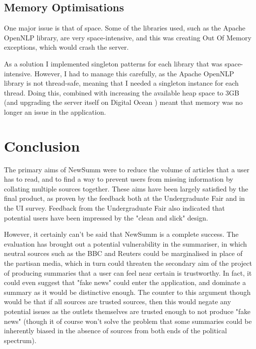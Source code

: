 \documentclass[12pt]{article}
\begin{document}
\label{apioptimisation}

\subsection{Memory Optimisations}

One major issue is that of space. Some of the libraries used, such as the Apache OpenNLP \cite{opennlp} library, are very space-intensive, and this was creating Out Of Memory exceptions, which would crash the server. 

As a solution I implemented singleton patterns for each library that was space-intensive. However, I had to manage this carefully, as the Apache OpenNLP library is not thread-safe, meaning that I needed a singleton instance for each thread. Doing this, combined with increasing the available heap space to 3GB (and upgrading the server itself on Digital Ocean \cite{digitalOcean}) meant that memory was no longer an issue in the application.


\newpage

\section{Conclusion}

The primary aims of NewSumm were to reduce the volume of articles that a user has to read, and to find a way to prevent users from missing information by collating multiple sources together. These aims have been largely satisfied by the final product, as proven by the feedback both at the Undergraduate Fair and in the UI survey. Feedback from the Undergraduate Fair also indicated that potential users have been impressed by the "clean and slick" design.

However, it certainly can't be said that NewSumm is a complete success. The evaluation has brought out a potential vulnerability in the summariser, in which neutral sources such as the BBC \cite{bbc} and Reuters \cite{reuters} could be marginalised in place of the partisan media, which in turn could threaten the secondary aim of the project of producing summaries that a user can feel near certain is trustworthy. In fact, it could even suggest that "fake news" could enter the application, and dominate a summary as it would be distinctive enough. The counter to this argument though would be that if all sources are trusted sources, then this would negate any potential issues as the outlets themselves are trusted enough to not produce "fake news" (though it of course won't solve the problem that some summaries could be inherently biased in the absence of sources from both ends of the political spectrum).
\end{document}
